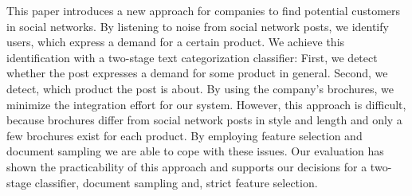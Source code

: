 
This paper introduces a new approach for companies to find potential customers in social networks.
By listening to noise from social network posts, we identify users, which express a demand for a certain product.
We achieve this identification with a two-stage text categorization classifier:
First, we detect whether the post  expresses a demand for some product in general.
Second, we detect, which product the post is about.
By using the company's brochures, we minimize the integration effort for our system.
However, this approach is difficult, because brochures differ from social network posts in style and length and only a few brochures exist for each product.
By employing feature selection and document sampling we are able to cope with these issues.
Our evaluation has shown the practicability of this approach and supports our decisions for a two-stage classifier, document sampling and, strict feature selection.
